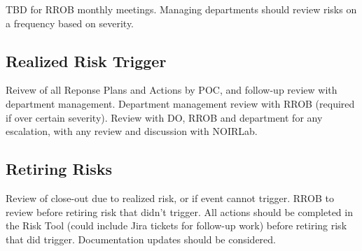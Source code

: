 TBD for RROB monthly meetings.
Managing departments should review risks on a frequency based on severity.

\subsection{Realized Risk Trigger}

Reivew of all Reponse Plans and Actions by POC, and follow-up review with department management.
Department management review with RROB (required if over certain severity).
Review with DO, RROB and department for any escalation, with any review and discussion with NOIRLab.

\subsection{Retiring Risks}

Review of close-out due to realized risk, or if event cannot trigger.
RROB to review before retiring risk that didn't trigger.
All actions should be completed in the Risk Tool (could include Jira tickets for follow-up work) before retiring risk that did trigger.
Documentation updates should be considered.
